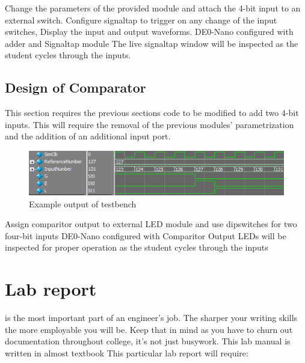          {Change the parameters of the provided module and attach the 4-bit input to an external switch. Configure signaltap to trigger on any change of the input switches, Display the input and output waveforms.}
         {DE0-Nano configured with adder and Signaltap module}
         {The live signaltap window will be inspected as the student cycles through the inputs.}

  \subsection{Design of Comparator}
    This section requires the previous sections code to be modified to add two 4-bit inputs. This will require the removal of the previous modules' parametrization and the addition of an additional input port. 
    \begin{figure}[H]
      \label{TestbenchOutput}
      \includegraphics[width=.48\textwidth]{Images/ComparitorTestbench.png}
      \caption{Example output of testbench}
    \end{figure}

      {Assign comparitor output to external LED module and use dipswitches for two four-bit inputs}
      {DE0-Nano configured with Comparitor}
      {Output LEDs will be inspected for proper operation as the student cycles through the inputs}

  \section{Lab report}
     is the most important part of an engineer's job. The sharper your writing skills the more employable you will be. Keep that in mind as you have to churn out documentation throughout college, it's not just busywork. This lab manual is written in almost textbook This particular lab report will require:
